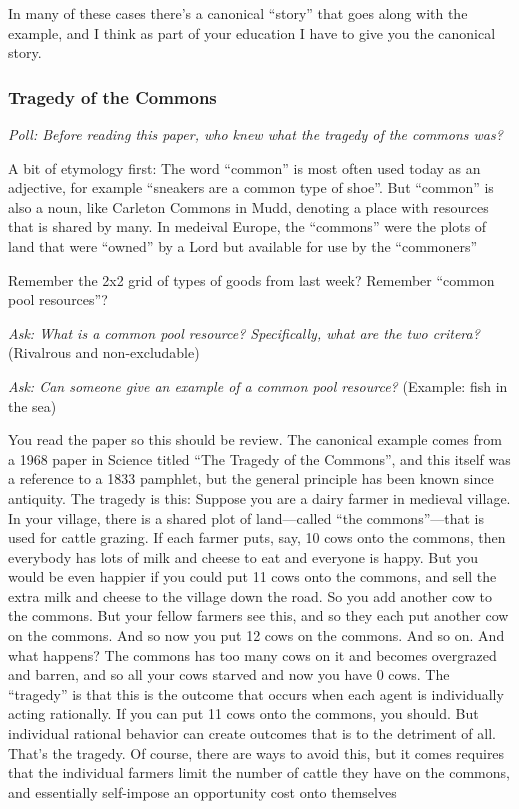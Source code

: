 \documentclass[11pt]{article}
\begin{document}
In many of these cases there's a canonical ``story'' that goes along with the example, and I think as part of your education I have to give you the canonical story.

\subsubsection{Tragedy of the Commons}

{\it Poll: Before reading this paper, who knew what the tragedy of the commons was?}

A bit of etymology first: The word ``common'' is most often used today as an adjective, for example ``sneakers are a common type of shoe''.
But ``common'' is also a noun, like Carleton Commons in Mudd, denoting a place with resources that is shared by many. In medeival Europe, the ``commons'' were the plots of land that were ``owned'' by a Lord but available for use by the ``commoners''

Remember the 2x2 grid of types of goods from last week? Remember ``common pool resources''?

{\it Ask: What is a common pool resource? Specifically, what are the two critera?} (Rivalrous and non-excludable)

{\it Ask: Can someone give an example of a common pool resource?} (Example: fish in the sea)

You read the paper so this should be review. The canonical example comes from a 1968 paper in Science titled “The Tragedy of the Commons”, and this itself was a reference to a 1833 pamphlet, but the general principle has been known since antiquity.
The tragedy is this: Suppose you are a dairy farmer in medieval village. In your village, there is a shared plot of land—called “the commons”---that is used for cattle grazing. If each farmer puts, say, 10 cows onto the commons, then everybody has lots of milk and cheese to eat and everyone is happy. But you would be even happier if you could put 11 cows onto the commons, and sell the extra milk and cheese to the village down the road. So you add another cow to the commons. But your fellow farmers see this, and so they each put another cow on the commons. And so now you put 12 cows on the commons. And so on. And what happens? The commons has too many cows on it and becomes overgrazed and barren, and so all your cows starved and now you have 0 cows.
The “tragedy” is that this is the outcome that occurs when each agent is individually acting rationally. If you can put 11 cows onto the commons, you should. But individual rational behavior can create outcomes that is to the detriment of all. That's the tragedy.
Of course, there are ways to avoid this, but it comes requires that the individual farmers limit the number of cattle they have on the commons, and essentially self-impose an opportunity cost onto themselves
\end{document}
